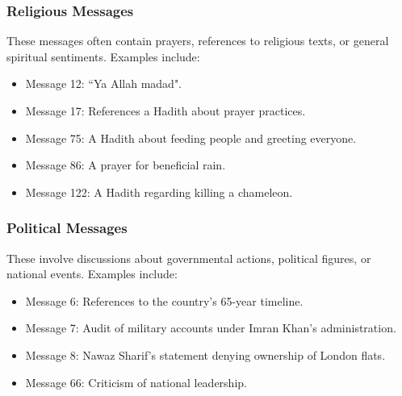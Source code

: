 \documentclass[12pt]{article}
\begin{document}
\subsubsection{Religious Messages}
These messages often contain prayers, references to religious texts, or general spiritual sentiments. Examples include:
\begin{itemize}
  \item Message 12: ``Ya Allah madad".
  \item Message 17: References a Hadith about prayer practices.
  \item Message 75: A Hadith about feeding people and greeting everyone.
  \item Message 86: A prayer for beneficial rain.
  \item Message 122: A Hadith regarding killing a chameleon.
\end{itemize}

\subsubsection{Political Messages}
These involve discussions about governmental actions, political figures, or national events. Examples include:
\begin{itemize}
  \item Message 6: References to the country's 65-year timeline.
  \item Message 7: Audit of military accounts under Imran Khan's administration.
  \item Message 8: Nawaz Sharif's statement denying ownership of London flats.
  \item Message 66: Criticism of national leadership.
\end{itemize}
\end{document}
